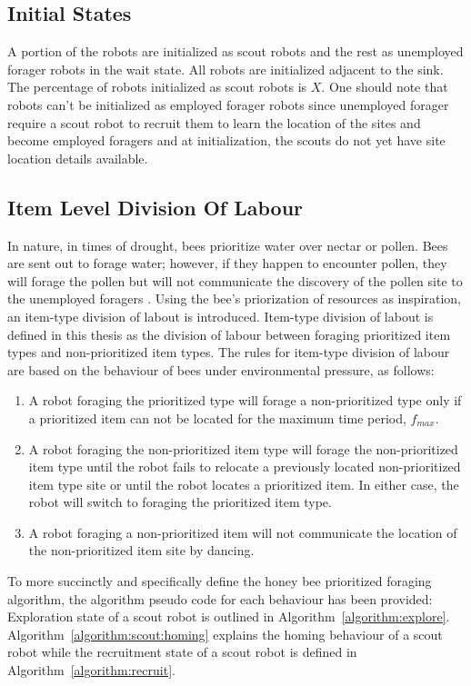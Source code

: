 \subsection{Initial States}

A portion of the robots are initialized as scout robots and the rest as unemployed forager robots in the wait state. All robots are initialized adjacent to the sink. The percentage of robots initialized as scout robots is $X$. One should note that robots can't be initialized as employed forager robots since unemployed forager require a scout robot to recruit them to learn the location of the sites and become employed foragers and at initialization, the scouts do not yet have site location details available.


\subsection{Item Level Division Of Labour}
In nature, in times of drought, bees prioritize water over nectar or pollen. Bees are sent out to forage water; however, if they happen to encounter pollen, they will forage the pollen but will not communicate the discovery of the pollen site to the unemployed foragers  \cite{seeley2009wisdom}. Using the bee's priorization of resources as inspiration, an item-type division of labout is introduced. Item-type division of labout is defined in this thesis as the division of labour between foraging prioritized item types and non-prioritized item types.
The rules for item-type division of labour are based on the behaviour of bees under environmental pressure, as follows:

\begin{enumerate}
\item A robot foraging the prioritized type will forage a non-prioritized type only if a prioritized item can not be located for the maximum time period, $f_{max}$.
\item A robot foraging the non-prioritized item type will forage the non-prioritized item type until the robot fails to relocate a previously located non-prioritized item type site or until the robot locates a prioritized item. In either case, the robot will switch to foraging the prioritized item type.
\item A robot foraging a non-prioritized item will not communicate the location of the non-prioritized item site by dancing. 
\end{enumerate}

To more succinctly and specifically define the honey bee prioritized foraging algorithm, the algorithm pseudo code for each behaviour has been provided: Exploration state of a scout robot is outlined in Algorithm~\ref{algorithm:explore}. Algorithm~\ref{algorithm:scout:homing} explains the homing behaviour of a scout robot while the recruitment state of a scout robot is defined in Algorithm~\ref{algorithm:recruit}. 

